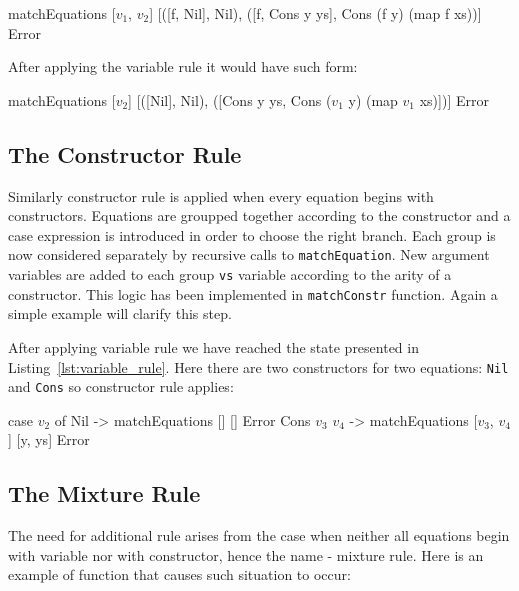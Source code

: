 \documentclass[12pt,a4paper]{report}
\begin{document}
\vspace*{0.2in}
\begin{code}[style=haskell,mathescape=true]
matchEquations [$v_{1}$, $v_{2}$]
               [([f, Nil], Nil),
                ([f, Cons y ys], Cons (f y) (map f xs))]
               Error
\end{code}

After applying the variable rule it would have such form:

\vspace*{0.2in}
\begin{code}[style=haskell,label=lst:variable_rule, caption={State after applying
  variable rule.}, mathescape=true]
matchEquations [$v_{2}$]
               [([Nil], Nil),
                ([Cons y ys, Cons ($v_{1}$ y) (map $v_{1}$ xs)])]
               Error
\end{code}

\subsection{The Constructor Rule}
\label{sec:constructor_rule}
Similarly constructor rule is applied when every equation begins with
constructors. Equations are groupped together according to the constructor and
a case expression is introduced in order to choose the right branch. Each group
is now considered separately by recursive calls to \texttt{matchEquation}. New
argument variables are added to each group \texttt{vs} variable according to
the arity of a constructor. This logic has been implemented in
\texttt{matchConstr} function. Again a simple example will clarify this step.

After applying variable rule we have reached the state presented in
Listing~\ref{lst:variable_rule}. Here there are two constructors for two
equations: \texttt{Nil} and \texttt{Cons} so constructor rule applies:

\vspace*{0.2in}
\begin{code}[style=haskell,label=lst:constructor_rule, caption={State after applying
  constructor rule.}, mathescape=true]
case $v_{2}$ of
    Nil       -> matchEquations []
                                []
                                Error
    Cons $v_{3}$ $v_{4}$ -> matchEquations [$v_{3}$, $v_{4}$]
                                [y, ys]
                                Error
\end{code}

\subsection{The Mixture Rule}
The need for additional rule arises from the case when neither all equations
begin with variable nor with constructor, hence the name - mixture rule. Here
is an example of function that causes such situation to occur:
\end{document}
